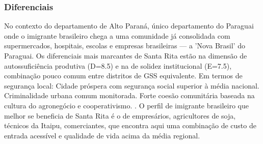\subsubsection*{Diferenciais}\label{dif-santa-rita-1013}
No contexto do departamento de Alto Paraná, único departamento do Paraguai onde o imigrante brasileiro chega a uma comunidade já consolidada com supermercados, hospitais, escolas e empresas brasileiras — a 'Nova Brasil' do Paraguai. Os diferenciais mais marcantes de Santa Rita estão na dimensão de autossuficiência produtiva (D=8.5) e na de solidez institucional (E=7.5), combinação pouco comum entre distritos de GSS equivalente. Em termos de segurança local: Cidade próspera com segurança social superior à média nacional. Criminalidade urbana comum monitorada. Forte coesão comunitária baseada na cultura do agronegócio e cooperativismo. . O perfil de imigrante brasileiro que melhor se beneficia de Santa Rita é o de empresários, agricultores de soja, técnicos da Itaipu, comerciantes, que encontra aqui uma combinação de custo de entrada acessível e qualidade de vida acima da média regional.
